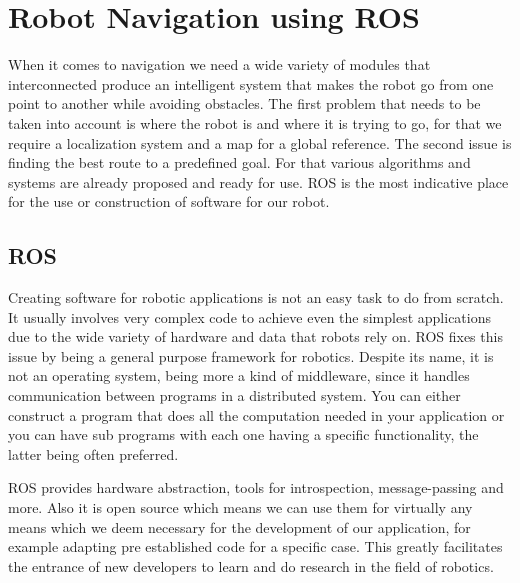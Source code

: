 \chapter{Robot Navigation using ROS} \label{ch:BaseWork}


When it comes to navigation we need a wide variety of modules that interconnected produce an intelligent system that makes the robot go from one point to another while avoiding obstacles. 
The first problem that needs to be taken into account is where the robot is and where it is trying to go, for that we require a localization system and a map for a global reference. The second issue is finding the best route to a predefined goal. For that various algorithms and systems are already proposed and ready for use. \ac{ROS} \cite{ros} is the most indicative place for the use or construction of software for our robot.

\section {ROS}
Creating software for robotic applications is not an easy task to do from scratch. It usually involves very complex code to achieve even the simplest applications due to the wide variety of hardware and data that robots rely on. \ac{ROS}  fixes this issue by being a general purpose framework for robotics. Despite its name, it is not an operating system, being more a kind of middleware, since it  handles communication between programs in a distributed system. You can either construct a program that does all the computation needed in your application or you can have sub programs with each one having a specific functionality, the latter being often preferred.

\ac{ROS} provides hardware abstraction, tools for introspection, message-passing and more. Also it is open source which means we can use them for virtually any means which we deem necessary for the development of our application, for example adapting pre established code for a specific case. This greatly facilitates the entrance of new developers to learn and do research in the field of robotics.
